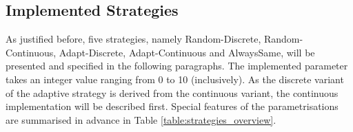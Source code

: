 \documentclass[11pt]{article}
\begin{document}
%
%

\subsection{Implemented Strategies} \label{sec:implemented_strategies}

As justified before, five strategies, namely Random-Discrete, Random-Continuous, Adapt-Discrete, Adapt-Continuous and AlwaysSame, will be presented and specified in the following paragraphs.
The implemented parameter takes an integer value ranging from 0 to 10 (inclusively).
As the discrete variant of the adaptive strategy is derived from the continuous variant, the continuous implementation will be described first.
Special features of the parametrisations are summarised in advance in Table \ref{table:strategies_overview}.
	
\def\wTstr{3.5cm}
\end{document}
